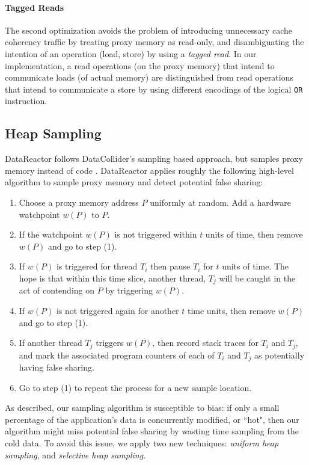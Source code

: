\documentclass{sig-alternate}
\newcommand{\Toolname}{DataReactor}
\begin{document}
\paragraph{Tagged Reads}
The second optimization avoids the problem of introducing unnecessary cache coherency traffic by treating proxy memory
as read-only, and disambiguating the intention of an operation (load, store) by using a \emph{tagged read}. In our implementation,
a read operations (on the proxy memory) that intend to communicate loads (of actual memory) are distinguished from
read operations that intend to communicate a store by using different encodings of the logical \texttt{OR} instruction.

\subsection{Heap Sampling}\label{sec:heapsample}

\Toolname{} follows DataCollider's sampling based approach, but samples proxy memory instead of code \cite{DataCollider}.
\Toolname{} applies roughly the following high-level algorithm to sample proxy memory and detect potential false sharing:
\begin{enumerate}
\item Choose a proxy memory address $P$ uniformly at random. Add a hardware watchpoint $w(P)$ to $P$.
\item If the watchpoint $w(P)$ is not triggered within $t$ units of time, then remove $w(P)$ and go to step (1).
\item If $w(P)$ is triggered for thread $T_i$ then pause $T_i$ for $t$ units of time. The hope is that within this
time slice, another thread, $T_j$ will be caught in the act of contending on $P$ by triggering $w(P)$.
\item If $w(P)$ is not triggered again for another $t$ time units, then remove $w(P)$ and go to step (1).
\item If another thread $T_j$ triggers $w(P)$, then record stack traces for $T_i$ and $T_j$, and mark the associated program
counters of each of $T_i$ and $T_j$ as potentially having false sharing.
\item Go to step (1) to repeat the process for a new sample location.
\end{enumerate}

As described, our sampling algorithm is susceptible to bias: if only a small percentage of the application's data is concurrently
modified, or ``hot", then our algorithm might miss potential false sharing by wasting time sampling from the cold data.
To avoid this issue, we apply two new techniques: \emph{uniform heap sampling}, and \emph{selective heap sampling}.
\end{document}
